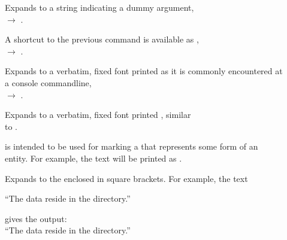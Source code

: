 \begin{description}
\item[] \enforcenewline%
  Expands to a string indicating a dummy argument, \EG{} \\
   $\rightarrow$
   \p.

\item[] \enforcenewline%
  A shortcut to the previous command \latexcmd{\placeholder{}} is available as \latexcmd{\plh{}}, \EG{} \\
   $\rightarrow$  \p.

\item[] \enforcenewline%
  Expands to a verbatim, fixed font printed  as it is commonly encountered at a console commandline, \EG{} \\
   $\rightarrow$  \p.

\item[] \enforcenewline%
  Expands to a verbatim, fixed font printed , similar \\
  to \latexcmd{\cmdline}.

\item[] \enforcenewline%
  \latexcmd{\entity} is intended to be used for marking a 
  that represents some form of an entity.  For example, the text
   will be printed as \p.

\item[] \enforcenewline%
  Expands to the  enclosed in square brackets.  For
  example, the text%
  \begin{CommandLineListing}[print=true, xleftmargin=0pt, gobble=4]%
    ``The data  reside in the
     directory.''
  \end{CommandLineListing}
  gives the output: \\
  ``The data  reside in the
   directory.''




\end{description}
